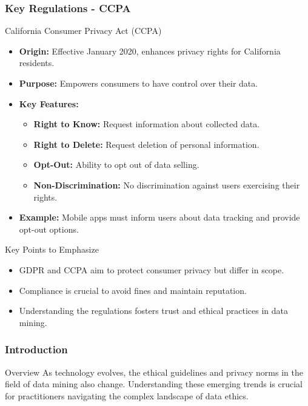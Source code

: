 \documentclass{beamer}
\begin{document}
\begin{frame}[fragile]
    \frametitle{Key Regulations - CCPA}

    \begin{block}{California Consumer Privacy Act (CCPA)}
        \begin{itemize}
            \item \textbf{Origin:} Effective January 2020, enhances privacy rights for California residents.
            \item \textbf{Purpose:} Empowers consumers to have control over their data.
            \item \textbf{Key Features:}
                \begin{itemize}
                    \item \textbf{Right to Know:} Request information about collected data.
                    \item \textbf{Right to Delete:} Request deletion of personal information.
                    \item \textbf{Opt-Out:} Ability to opt out of data selling.
                    \item \textbf{Non-Discrimination:} No discrimination against users exercising their rights.
                \end{itemize}
            \item \textbf{Example:} Mobile apps must inform users about data tracking and provide opt-out options.
        \end{itemize}
    \end{block}

    \begin{block}{Key Points to Emphasize}
        \begin{itemize}
            \item GDPR and CCPA aim to protect consumer privacy but differ in scope.
            \item Compliance is crucial to avoid fines and maintain reputation.
            \item Understanding the regulations fosters trust and ethical practices in data mining.
        \end{itemize}
    \end{block}
\end{frame}

\begin{frame}[fragile]
    \frametitle{Introduction}
    \begin{block}{Overview}
        As technology evolves, the ethical guidelines and privacy norms in the field of data mining also change. Understanding these emerging trends is crucial for practitioners navigating the complex landscape of data ethics.
    \end{block}
\end{frame}
\end{document}
